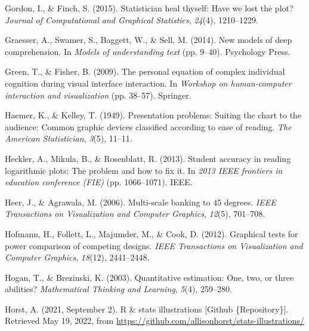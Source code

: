 \documentclass[print]{nuthesis}
\newlength{\cslhangindent}
\newenvironment{CSLReferences}[2]%
{\setlength{\parindent}{0pt}%
\everypar{\setlength{\hangindent}{\cslhangindent}}\ignorespaces}%
{\par}
\begin{document}
\begin{CSLReferences}{1}{0}
\leavevmode{}%
Gordon, I., \& Finch, S. (2015). Statistician heal thyself: Have we lost the plot? \emph{Journal of Computational and Graphical Statistics}, \emph{24}(4), 1210--1229.

\leavevmode{}%
Graesser, A., Swamer, S., Baggett, W., \& Sell, M. (2014). New models of deep comprehension. In \emph{Models of understanding text} (pp. 9--40). Psychology Press.

\leavevmode{}%
Green, T., \& Fisher, B. (2009). The personal equation of complex individual cognition during visual interface interaction. In \emph{Workshop on human-computer interaction and visualization} (pp. 38--57). Springer.

\leavevmode{}%
Haemer, K., \& Kelley, T. (1949). Presentation problems: Suiting the chart to the audience: Common graphic devices classified according to ease of reading. \emph{The American Statistician}, \emph{3}(5), 11--11.

\leavevmode{}%
Heckler, A., Mikula, B., \& Rosenblatt, R. (2013). Student accuracy in reading logarithmic plots: The problem and how to fix it. In \emph{2013 IEEE frontiers in education conference (FIE)} (pp. 1066--1071). IEEE.

\leavevmode{}%
Heer, J., \& Agrawala, M. (2006). Multi-scale banking to 45 degrees. \emph{IEEE Transactions on Visualization and Computer Graphics}, \emph{12}(5), 701--708.

\leavevmode{}%
Hofmann, H., Follett, L., Majumder, M., \& Cook, D. (2012). Graphical tests for power comparison of competing designs. \emph{IEEE Transactions on Visualization and Computer Graphics}, \emph{18}(12), 2441--2448.

\leavevmode{}%
Hogan, T., \& Brezinski, K. (2003). Quantitative estimation: One, two, or three abilities? \emph{Mathematical Thinking and Learning}, \emph{5}(4), 259--280.

\leavevmode{}%
Horst, A. (2021, September 2). R \& stats illustrations {[}Github \{Repository\}{]}. Retrieved May 19, 2022, from \url{https://github.com/allisonhorst/stats-illustrations/}


\end{CSLReferences}
\end{document}
